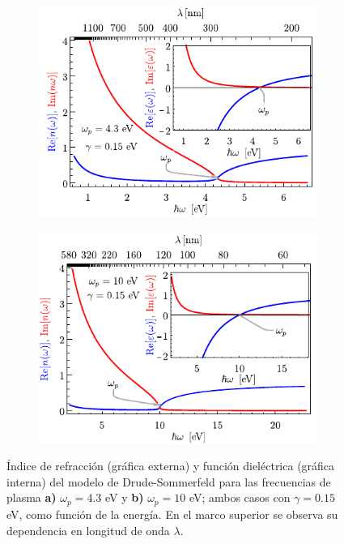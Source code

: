 	\begin{figure}[h!]\centering\hspace*{-1.5em}
	\begin{subfigure}{.01\linewidth}\caption{}\label{sfig:Drude4eV}\vspace{3.75cm}\end{subfigure}
	\begin{subfigure}{.45\linewidth}\hspace*{-1.3em}
	\includegraphics[scale=1]{1-Teoria/figs/1-4-varepsn4eV.pdf}
	\end{subfigure}
	\begin{subfigure}{.01\linewidth}\caption{}\label{sfig:Drude10eV}\vspace{3.75cm}\end{subfigure}
	\begin{subfigure}{.45\linewidth}\hspace*{-1em}
	\includegraphics[scale=1 ]{1-Teoria/figs/1-4-varepsn10eV.pdf}
	\end{subfigure}\vspace*{-.7em}
	\caption{ Índice de refracción (gráfica externa) y función dieléctrica (gráfica interna) del modelo de Drude-Sommerfeld para las frecuencias de plasma \textbf{a)} $\omega_p=4. 3$ eV y \textbf{b)} $\omega_p=10$ eV; ambos casos con $\gamma=0. 15$ eV, como función de la energía.  En el marco superior se observa su dependencia en longitud de onda $\lambda$. }\label{fig:Drude}
	\end{figure}	



